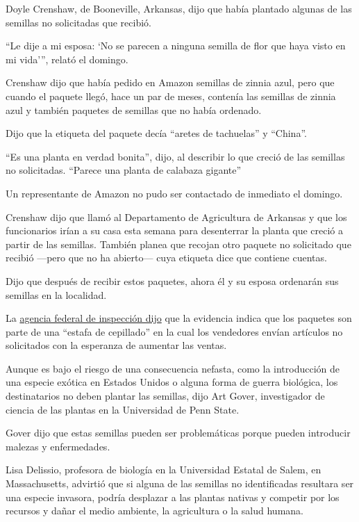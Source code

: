 Doyle Crenshaw, de Booneville, Arkansas, dijo que había plantado algunas
de las semillas no solicitadas que recibió.

``Le dije a mi esposa: `No se parecen a ninguna semilla de flor que haya
visto en mi vida''', relató el domingo.

Crenshaw dijo que había pedido en Amazon semillas de zinnia azul, pero
que cuando el paquete llegó, hace un par de meses, contenía las semillas
de zinnia azul y también paquetes de semillas que no había ordenado.

Dijo que la etiqueta del paquete decía ``aretes de tachuelas'' y
``China''.

``Es una planta en verdad bonita'', dijo, al describir lo que creció de
las semillas no solicitadas. ``Parece una planta de calabaza gigante''

Un representante de Amazon no pudo ser contactado de inmediato el
domingo.

Crenshaw dijo que llamó al Departamento de Agricultura de Arkansas y que
los funcionarios irían a su casa esta semana para desenterrar la planta
que creció a partir de las semillas. También planea que recojan otro
paquete no solicitado que recibió ---pero que no ha abierto--- cuya
etiqueta dice que contiene cuentas.

Dijo que después de recibir estos paquetes, ahora él y su esposa
ordenarán sus semillas en la localidad.

La
\href{https://www.aphis.usda.gov/aphis/newsroom/stakeholder-info/sa_by_date/sa-2020/sa-07/seeds-china}{agencia
federal de inspección dijo} que la evidencia indica que los paquetes son
parte de una ``estafa de cepillado'' en la cual los vendedores envían
artículos no solicitados con la esperanza de aumentar las ventas.

Aunque es bajo el riesgo de una consecuencia nefasta, como la
introducción de una especie exótica en Estados Unidos o alguna forma de
guerra biológica, los destinatarios no deben plantar las semillas, dijo
Art Gover, investigador de ciencia de las plantas en la Universidad de
Penn State.

Gover dijo que estas semillas pueden ser problemáticas porque pueden
introducir malezas y enfermedades.

Lisa Delissio, profesora de biología en la Universidad Estatal de Salem,
en Massachusetts, advirtió que si alguna de las semillas no
identificadas resultara ser una especie invasora, podría desplazar a las
plantas nativas y competir por los recursos y dañar el medio ambiente,
la agricultura o la salud humana.

